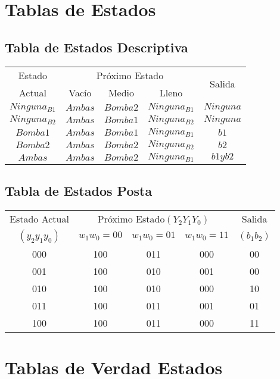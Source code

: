 \documentclass[10pt,a4paper]{article}
\begin{document}
\section*{Tablas de Estados}
\subsection*{Tabla de Estados Descriptiva}

\begin{table}[ht]
	\centering
	\begin{tabular}{c|ccc|c}
	Estado & \multicolumn{3}{c|}{Próximo Estado} & \multirow{2}{*}{Salida}\\
	\cline{2-4}
	Actual & Vacío & Medio & Lleno \\
	\hline
	$Ninguna_{B1}$ 	& $Ambas$ & $Bomba 2$ & $Ninguna_{B1}$ & $Ninguna$ \\
	$Ninguna_{B2}$ 	& $Ambas$ & $Bomba 1$ & $Ninguna_{B2}$ & $Ninguna$ \\
	$Bomba 1$ 		& $Ambas$ & $Bomba 1$ & $Ninguna_{B1}$ & $b1$ \\
	$Bomba 2$ 		& $Ambas$ & $Bomba 2$ & $Ninguna_{B2}$ & $b2$ \\
	$Ambas$ 		& $Ambas$ & $Bomba 2$ & $Ninguna_{B1}$ & $b1 y b2$ \\
	\end{tabular}
\end{table}

\subsection*{Tabla de Estados Posta}

\begin{table}[ht]
	\centering
	\begin{tabular}{c|c|c|c|c}
	Estado Actual & \multicolumn{3}{c|}{Próximo Estado$(Y_2Y_1Y_0)$} & Salida\\
	\cline{2-4}
	$(y_2y_1y_0)$ & $w_1w_0=00$ & $w_1w_0=01$ & $w_1w_0=11$ & $(b_1b_2)$\\
	\hline
	000 & 100 & 011 & 000 & 00 \\
	001 & 100 & 010 & 001 & 00 \\
	010 & 100 & 010 & 000 & 10 \\
	011 & 100 & 011 & 001 & 01 \\
	100 & 100 & 011 & 000 & 11 \\
	\end{tabular}
\end{table}

\section*{Tablas de Verdad Estados}
\end{document}
